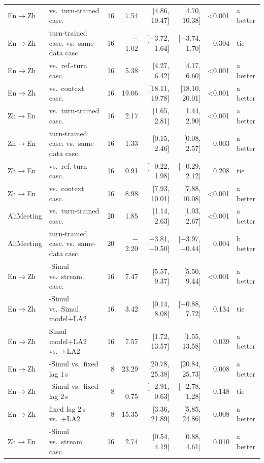 \begin{table}[t]
{\begin{tabular}{llrrrrrl}
En$\rightarrow$Zh & \sys{} vs.\ turn-trained casc. & 16 & 7.54 & [4.86, 10.47] & [4.70, 10.38] & {<}0.001 & a better \\
En$\rightarrow$Zh & turn-trained casc. vs.\ same-data casc. & 16 & $-$1.02 & [$-$3.72, 1.64] & [$-$3.74, 1.70] & 0.304 & tie \\
En$\rightarrow$Zh & \sys{} vs.\ ref.-turn casc. & 16 & 5.38 & [4.27, 6.42] & [4.17, 6.60] & {<}0.001 & a better \\
En$\rightarrow$Zh & \sys{} vs.\ context casc. & 16 & 19.06 & [18.11, 19.78] & [18.10, 20.01] & {<}0.001 & a better \\
Zh$\rightarrow$En & \sys{} vs.\ turn-trained casc. & 16 & 2.17 & [1.65, 2.81] & [1.44, 2.90] & {<}0.001 & a better \\
Zh$\rightarrow$En & turn-trained casc. vs.\ same-data casc. & 16 & 1.33 & [0.15, 2.46] & [0.08, 2.57] & 0.003 & a better \\
Zh$\rightarrow$En & \sys{} vs.\ ref.-turn casc. & 16 & 0.91 & [$-$0.22, 1.98] & [$-$0.29, 2.12] & 0.208 & tie \\
Zh$\rightarrow$En & \sys{} vs.\ context casc. & 16 & 8.98 & [7.93, 10.01] & [7.88, 10.08] & {<}0.001 & a better \\
AliMeeting & \sys{} vs.\ turn-trained casc. & 20 & 1.85 & [1.14, 2.63] & [1.03, 2.67] & {<}0.001 & a better \\
AliMeeting & turn-trained casc. vs.\ same-data casc. & 20 & $-$2.20 & [$-$3.81, $-$0.50] & [$-$3.97, $-$0.44] & 0.004 & b better \\
En$\rightarrow$Zh & \sys{}-Simul vs.\ stream. casc. & 16 & 7.47 & [5.57, 9.37] & [5.50, 9.44] & {<}0.001 & a better \\
En$\rightarrow$Zh & \sys{}-Simul vs.\ Simul model+LA2 & 16 & 3.42 & [0.14, 8.08] & [$-$0.88, 7.72] & 0.134 & tie \\
En$\rightarrow$Zh & Simul model+LA2 vs.\ \sys{}+LA2 & 16 & 7.57 & [1.72, 13.57] & [1.55, 13.58] & 0.039 & a better \\
En$\rightarrow$Zh & \sys{}-Simul vs.\ fixed lag 1\,s & 8 & 23.29 & [20.78, 25.38] & [20.84, 25.73] & 0.008 & a better \\
En$\rightarrow$Zh & \sys{}-Simul vs.\ fixed lag 2\,s & 8 & $-$0.75 & [$-$2.91, 0.63] & [$-$2.78, 1.28] & 0.148 & tie \\
En$\rightarrow$Zh & fixed lag 2\,s vs.\ \sys{}+LA2 & 8 & 15.35 & [3.36, 21.89] & [5.85, 24.86] & 0.008 & a better \\
Zh$\rightarrow$En & \sys{}-Simul vs.\ stream. casc. & 16 & 2.74 & [0.54, 4.19] & [0.88, 4.61] & 0.010 & a better \\

\end{tabular}}
\end{table}
